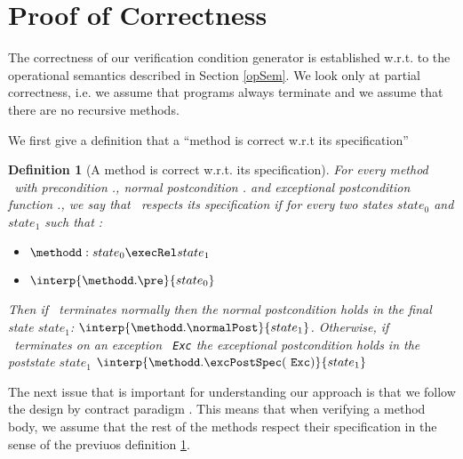 \newtheorem{defCorrect}{Definition}[section]
\newtheorem{lemma0}{Lemma}[section] %
\newtheorem{lemma1}[lemma0]{Lemma} %
\newtheorem{lemma2}[lemma0]{Lemma} %
\newtheorem{vcGenCorrect}[lemma0]{Theorem}

\newcommand{\state}[1]{ \tau_{#1} } 
\newcommand{\straightBraces}[1]{ \texttt{ (} #1 \texttt{ )} }
\newcommand{\tbc}{\textit{TBC}}


\section{Proof of Correctness } \label{proof}

The correctness of our verification  condition generator is established w.r.t.
to the operational semantics described in Section \ref{opSem}. We look only at
 partial correctness, i.e. we assume that programs always terminate and we assume that there are no recursive methods.

We first give a definition that a ``method is correct w.r.t its specification''

\begin{defCorrect}[A method is correct w.r.t. its specification] \label{defCorrect}
For every method \methodd \ with precondition \methodd.\pre, normal postcondition \methodd.\normalPost
and exceptional postcondition function \methodd.\excPostSpec, we say that \methodd \ respects its specification if 
for every two states $state_0$ and $state_1$ such that :
\begin{itemize}
      \item   $\methodd : state_0 \execRel state_1   $
      \item   $ \interp{\methodd.\pre }{ state_0 }$
\end{itemize}
Then if \methodd \ terminates normally then the normal postcondition holds in the final state $state_1 $:  $\interp{\methodd.\normalPost}{state_1}$. 
Otherwise, if  \methodd \ terminates on an exception \mbox{ \rm \texttt{Exc}} the exceptional postcondition holds in the poststate $state_1 $
$ \interp{\methodd.\excPostSpec(  \mbox{ \rm \texttt{Exc}} )}{state_1} $
\end{defCorrect}
 
 The next issue that is important for understanding our approach is that we follow the design by 
 contract paradigm \cite{M97oos}. This means that when verifying a method body, we assume that the
 rest of the methods respect their
 specification in the sense of the previuos definition \ref{defCorrect}.


